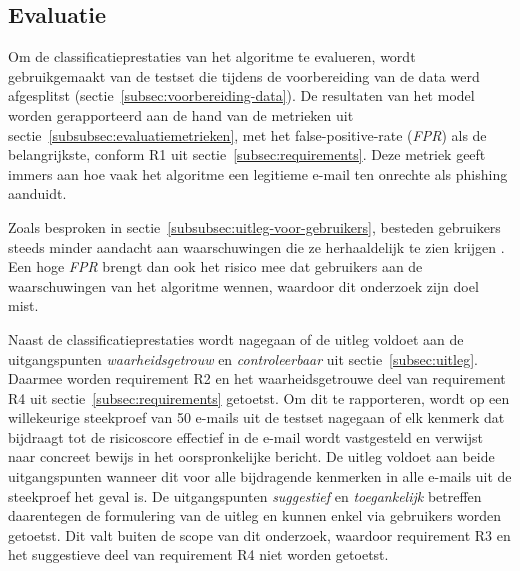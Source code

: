 \subsection{Evaluatie}
\label{sec:evaluatie}

Om de classificatieprestaties van het algoritme te evalueren, wordt gebruikgemaakt van de testset die tijdens de voorbereiding van de data werd afgesplitst (sectie~\ref{subsec:voorbereiding-data}). De resultaten van het model worden gerapporteerd aan de hand van de metrieken uit sectie~\ref{subsubsec:evaluatiemetrieken}, met het false-positive-rate (\emph{FPR}) als de belangrijkste, conform R1 uit sectie~\ref{subsec:requirements}. Deze metriek geeft immers aan hoe vaak het algoritme een legitieme e-mail ten onrechte als phishing aanduidt. 

Zoals besproken in sectie~\ref{subsubsec:uitleg-voor-gebruikers}, besteden gebruikers steeds minder aandacht aan waarschuwingen die ze herhaaldelijk te zien krijgen \autocite{Anderson2015}. Een hoge \emph{FPR} brengt dan ook het risico mee dat gebruikers aan de waarschuwingen van het algoritme wennen, waardoor dit onderzoek zijn doel mist. 

Naast de classificatieprestaties wordt nagegaan of de uitleg voldoet aan de uitgangspunten \emph{waarheidsgetrouw} en \emph{controleerbaar} uit sectie~\ref{subsec:uitleg}. Daarmee worden requirement R2 en het waarheidsgetrouwe deel van requirement R4 uit sectie~\ref{subsec:requirements} getoetst. 
Om dit te rapporteren, wordt op een willekeurige steekproef van 50 e-mails uit de testset nagegaan of elk kenmerk dat bijdraagt tot de risicoscore effectief in de e-mail wordt vastgesteld en verwijst naar concreet bewijs in het oorspronkelijke bericht. De uitleg voldoet aan beide uitgangspunten wanneer dit voor alle bijdragende kenmerken in alle e-mails uit de steekproef het geval is. De uitgangspunten \emph{suggestief} en \emph{toegankelijk} betreffen daarentegen de formulering van de uitleg en kunnen enkel via gebruikers worden getoetst. Dit valt buiten de scope van dit onderzoek, waardoor requirement R3 en het suggestieve deel van requirement R4 niet worden getoetst.